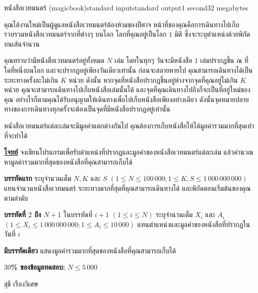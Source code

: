 \documentclass[11pt,a4paper]{article}
\begin{document}
\begin{problem}{หนังสือเวทมนตร์ (magicbook)}{standard input}{standard output}{1 second}{32 megabytes}

คุณได้งานใหม่เป็นผู้ดูแลหนังสือเวทมนตร์ต้องห้ามของปีศาจ หน้าที่ของคุณคือการเดินทางไปเก็บรวบรวมหนังสือเวทมนตร์จากที่ต่างๆ บนโลก โลกที่คุณอยู่เป็นโลก $1$ มิติ ซึ่งจะระบุตำแหน่งด้วยพิกัดบนเส้นจำนวน

คุณทราบว่ามีหนังสือเวทมนตร์อยู่ทั้งหมด $N$ เล่ม โดยในทุกๆ วันจะมีหนังสือ $1$ เล่มปรากฏขึ้น ณ ที่ใดที่หนึ่งบนโลก และจะปรากฏอยู่เพียงวันเดียวเท่านั้น ก่อนจะสลายหายไป คุณสามารถเดินทางได้เป็นระยะทางครั้งละไม่เกิน $K$ หน่วย ดังนั้น หากจุดที่หนังสือปรากฏขึ้นอยู่ห่างจากจุดที่คุณอยู่ไม่เกิน $K$ หน่วย คุณจะสามารถเดินทางไปเก็บหนังสือเล่มนั้นได้ และจุดที่คุณเดินทางไปถึงก็จะเป็นที่อยู่ใหม่ของคุณ อย่างไรก็ตามคุณได้รับอนุญาตให้เดินทางเพื่อไปเก็บหนังสือเพียงอย่างเดียว ดังนั้นจุดหมายปลายทางของการเดินทางทุกครั้งจะต้องเป็นจุดที่มีหนังสือปรากฏอยู่เท่านั้น

หนังสือเวทมนตร์แต่ละเล่มจะมีมูลค่าแตกต่างกันไป คุณต้องการเก็บหนังสือให้ได้มูลค่ารวมมากที่สุดเท่าที่จะทำได้

\bigskip
\underline{\textbf{โจทย์}}  จงเขียนโปรแกรมเพื่อรับตำแหน่งที่ปรากฏและมูลค่าของหนังสือเวทมนตร์แต่ละเล่ม แล้วคำนวณหามูลค่ารวมมากที่สุดของหนังสือที่คุณสามารถเก็บได้


\InputFile

\textbf{บรรทัดแรก} ระบุจำนวนเต็ม $N, K$ และ $S$ $(1 \leq N \leq 100\,000; 1 \leq K,S \leq 1\,000\,000\,000)$ แทนจำนวนหนังสือเวทมนตร์ ระยะทางมากที่สุดที่คุณสามารถเดินทางได้ และพิกัดตอนเริ่มต้นของคุณ ตามลำดับ

\textbf{บรรทัดที่ $2$ ถึง $N+1$} ในบรรทัดที่ $i+1$ $(1 \leq i \leq N)$ ระบุจำนวนเต็ม $X_i$ และ $A_i$ $(1 \leq X_i ≤ 1\,000\,000\,000; 1 \leq A_i \leq 10\,000)$ แทนตำแหน่งและมูลค่าของหนังสือที่ปรากฏในวันที่ $i$


\OutputFile

\textbf{มีบรรทัดเดียว} แสดงมูลค่ารวมมากที่สุดของหนังสือที่คุณสามารถเก็บได้

\Examples

\begin{example}
%
%
\end{example}

\Scoring

\textbf{$30$\% ของข้อมูลทดสอบ:} $N \leq 5\,000$

\Source

สุธี เรืองวิเศษ

\end{problem}
\end{document}
